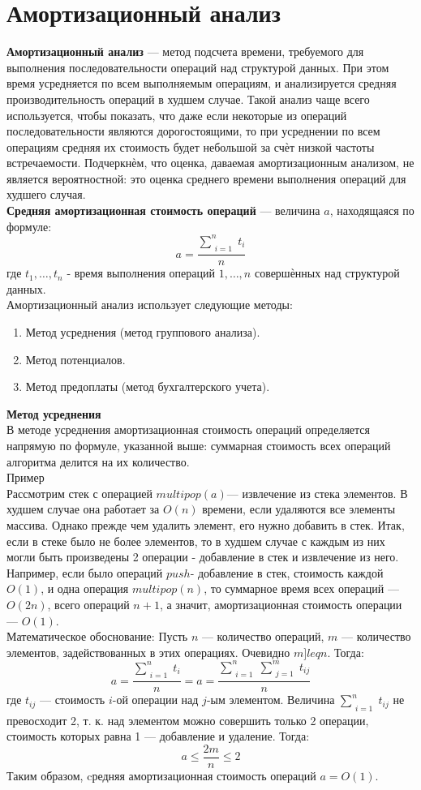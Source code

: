 \documentclass[a4paper]{article}
\begin{document}
\section{Амортизационный анализ}
\textbf{Амортизационный анализ} — метод подсчета времени, требуемого для выполнения последовательности операций над структурой данных. При этом время усредняется по всем выполняемым операциям, и анализируется средняя производительность операций в худшем случае. Такой анализ чаще всего используется, чтобы показать, что даже если некоторые из операций последовательности являются дорогостоящими, то при усреднении по всем операциям средняя их стоимость будет небольшой за счѐт низкой частоты встречаемости. Подчеркнѐм, что оценка, даваемая амортизационным анализом, не является вероятностной: это оценка среднего времени выполнения операций для худшего случая. \\
\textbf{Средняя амортизационная стоимость операций} — величина $a$, находящаяся по формуле:
$$ a= \frac{\sum_{\substack{i=1}}^n t_i}{n} $$
где $t_1, \ldots, t_n$ - время выполнения операций $1, \ldots, n$ совершѐнных над структурой данных.\\
Амортизационный анализ использует следующие методы:
\begin{enumerate}
	\item Метод усреднения (метод группового анализа).
	\item Метод потенциалов.
	\item Метод предоплаты (метод бухгалтерского учета).
\end{enumerate}
\textbf{Метод усреднения} \\
В методе усреднения амортизационная стоимость операций определяется напрямую по формуле, указанной выше: суммарная стоимость всех операций алгоритма делится на их количество.\\
Пример\\
Рассмотрим стек с операцией $multipop(a)$— извлечение из стека элементов. В худшем случае она работает за $O(n)$ времени, если удаляются все элементы массива. Однако прежде чем удалить элемент, его нужно добавить в стек. Итак, если в стеке было не более элементов, то в худшем случае с каждым из них могли быть произведены 2 операции - добавление в стек и извлечение из него. Например, если было операций $push$- добавление в стек, стоимость каждой $O(1)$, и одна операция $multipop(n)$, то суммарное время всех операций — $O(2n)$, всего операций $n+1$, а значит, амортизационная стоимость операции — $O(1)$. \\
Математическое обоснование:
Пусть $n$ — количество операций, $m$ — количество элементов, задействованных в этих операциях. Очевидно $m ]leq n$. Тогда:
$$ a = \frac{\sum_{\substack{i=1}}^n t_i}{n} = a= \frac{\sum_{\substack{i=1}}^n \sum_{\substack{j=1}}^m t_{ij}}{n} $$
где $t_{ij}$ — стоимость $i$-ой операции над $j$-ым элементом. Величина $\sum_{\substack{i=1}}^n t_{ij}$ не превосходит 2, т. к. над элементом можно совершить только 2 операции, стоимость которых равна 1 — добавление и удаление. Тогда:
$$ a \leq \frac{2m}{n} \leq 2 $$
Таким образом, cредняя амортизационная стоимость операций $a=O(1)$. \\
\end{document}
